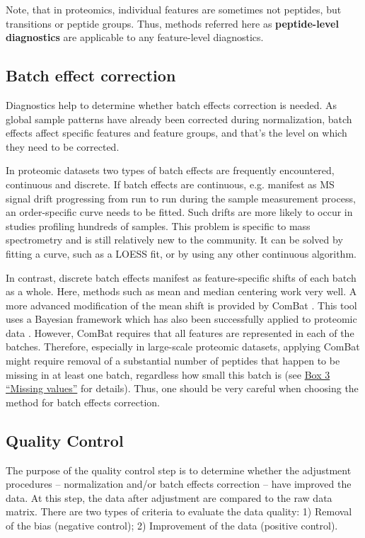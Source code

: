 \documentclass[num-refs]{wiley-article}
\begin{document}
Note, that in proteomics, individual features are sometimes not peptides, but transitions or peptide groups. Thus, methods referred here as \textbf{peptide-level diagnostics} are applicable to any feature-level diagnostics.

\subsection{Batch effect correction}

Diagnostics help to determine whether batch effects correction is needed. As global sample patterns have already been corrected during normalization, batch effects affect specific features and feature groups, and that’s the level on which they need to be corrected.

In proteomic datasets two types of batch effects are frequently encountered, continuous and discrete. If batch effects are continuous, e.g.  manifest as MS signal drift progressing from run to run during the sample measurement process, an order-specific curve needs to be fitted. Such drifts are more likely to occur in studies profiling hundreds of samples. This problem is specific to mass spectrometry and is still relatively new to the community. It can be solved by fitting a curve, such as a LOESS fit, or by using any other continuous algorithm.

In contrast, discrete batch effects manifest as feature-specific shifts of each batch as a whole. Here, methods such as mean and median centering work very well. A more advanced modification of the mean shift is provided by ComBat \cite{Johnson:2007aa}. This tool uses a Bayesian framework which has also been successfully applied to proteomic data \cite{Lee:2019aa}. However, ComBat requires that all features are represented in each of the batches. Therefore, especially in large-scale proteomic datasets, applying ComBat might require removal of  a substantial number of peptides that happen to be missing in at least one batch, regardless how small this batch is (see \hyperref[box:Box3_missingness]{Box 3 “Missing values”} for details). Thus, one should be very careful when choosing the method for batch effects correction.

\subsection{Quality Control}\label{subsec:qc}

The purpose of the quality control step is to determine whether the adjustment procedures – normalization and/or batch effects correction – have improved the data. At this step, the data after adjustment are compared to the raw data matrix. There are two types of criteria to evaluate the data quality: 1) Removal of the bias (negative control); 2) Improvement of the data (positive control).
\end{document}

